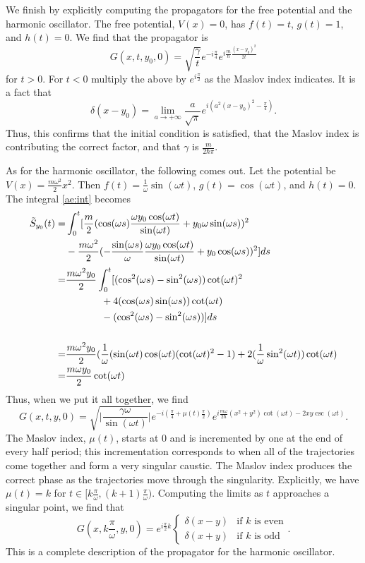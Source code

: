 \documentclass[11pt]{article}
\theoremstyle{remark}
\begin{document}
We finish by explicitly computing the propagators for the
free potential and the harmonic oscillator. The free potential, $V(x)
=0$, has $f(t) = t$, $g(t) = 1$, and $h(t) = 0$.  We
find that the propagator is 
\[
 G(x,t, y_0, 0) = 
\sqrt{\frac{\gamma}{t}} e^{-i\frac{\pi}{4}} e^{i \frac{m}{\ensuremath{\hbar}} 
\frac{(x-y_0)^2}{2t}}
\]
for $t > 0$. For $t<0$ multiply the above by $e^{i\frac{\pi}{2}}$ as
the Maslov index indicates. It is a fact that 
\[
\delta (x-y_0) = \lim_{a \to +\infty} \frac{a}{\sqrt{\pi}} e^{i(a^2
(x-y_0)^2 - \frac{\pi}{4})} . 
\]
Thus, this confirms that the initial condition is satisfied, that the
Maslov index is contributing the correct factor, and that
 $\gamma$ is $ \frac{m}{2\ensuremath{\hbar}
\pi}$.
   
 
As for the harmonic oscillator, the following comes out. Let the
potential be $V(x) = \frac{m\omega^2}{2} x^2$. Then $f(t) =
\frac{1}{\omega} \sin(\omega t)$, $g(t) = \cos(\omega t)$, and $h(t) = 0$.  
The integral \eqref{ae:int} becomes 
\[
\begin{split}
\tilde {S}_{y_0}(t) =& 
\int_0^t [\frac{m}{2}(\cos(\omega s) \frac{\omega y_0 \cos(\omega
t)}{\sin(\omega t)} + y_0 \omega \sin(\omega s) )^2
\\& -\frac{m \omega^2}{2}  (-\frac{\sin(\omega s)}{\omega} 
 \frac{\omega y_0 \cos(\omega
t)}{\sin(\omega t)}+y_0 \cos(\omega
s))^2 ] ds \\
=&\frac{m \omega ^2 y_0}{2} \int_0^t[(\cos^2 (\omega s) - \sin^2(\omega
s))  \cot(\omega t)^2 
\\& \hspace{.5in} +4 (\cos(\omega s) \sin(\omega s)) \cot(\omega t)   
\\& \hspace{.5in} -( \cos^2 (\omega s) - \sin^2(\omega s) )]ds \\ 
\\=&  \frac{m \omega ^2 y_0}{2} (\frac{1}{\omega}(\sin (\omega
t)\cos(\omega t)  (\cot(\omega t)^2 -1) 
+2 (\frac{1}{\omega} \sin^2(\omega t)) \cot(\omega t)   
\\=& 
\frac{m \omega y_0}{2} \cot(\omega t) 
\end{split}
\]
Thus, when we put it all together, we find 
\[
G(x,t, y, 0) = 
\sqrt{\ensuremath{\lvert {\frac{\gamma \omega}{\sin(\omega t)}} \rvert}} e^{-i(\frac{\pi}{4}
+ \mu(t) \frac{\pi}{2})}  
e^{i \frac{m \omega}{2\ensuremath{\hbar}} 
(x^2+y^2)\cot(\omega t) - 2 xy \csc(\omega t)}.
\]
The Maslov index, $\mu(t)$, starts at $0$ and is incremented by one at
the end of every half period; this incrementation corresponds to when
all of the trajectories come together and 
form a very singular caustic. 
The Maslov index produces the correct
phase as the trajectories move through the singularity. 
Explicitly, we have $\mu(t) = k $ for $t \in [k\frac{\pi}{\omega},
(k+1) \frac{\pi}{\omega})$. Computing the limits as $t$
approaches a singular point, we find that 
\[
G(x, k\frac{\pi}{\omega}, y, 0) = e^{i \frac{\pi}{2} k} 
\begin{cases}
\delta (x-y) &\text{if $k$ is even} \\
\delta (x+y) &\text{if $k$ is odd}  
\end{cases}.
\]
This is a complete description of the propagator for the harmonic
oscillator.
\end{document}

